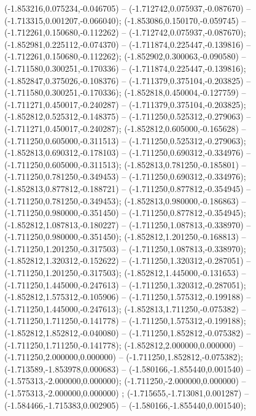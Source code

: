  (-1.853216,0.075234,-0.046705) -- (-1.712742,0.075937,-0.087670) -- (-1.713315,0.001207,-0.066040);
 (-1.853086,0.150170,-0.059745) -- (-1.712261,0.150680,-0.112262) -- (-1.712742,0.075937,-0.087670);
 (-1.852981,0.225112,-0.074370) -- (-1.711874,0.225447,-0.139816) -- (-1.712261,0.150680,-0.112262);
 (-1.852902,0.300063,-0.090580) -- (-1.711580,0.300251,-0.170336) -- (-1.711874,0.225447,-0.139816);
 (-1.852847,0.375026,-0.108376) -- (-1.711379,0.375104,-0.203825) -- (-1.711580,0.300251,-0.170336);
 (-1.852818,0.450004,-0.127759) -- (-1.711271,0.450017,-0.240287) -- (-1.711379,0.375104,-0.203825);
 (-1.852812,0.525312,-0.148375) -- (-1.711250,0.525312,-0.279063) -- (-1.711271,0.450017,-0.240287);
 (-1.852812,0.605000,-0.165628) -- (-1.711250,0.605000,-0.311513) -- (-1.711250,0.525312,-0.279063);
 (-1.852813,0.690312,-0.178103) -- (-1.711250,0.690312,-0.334976) -- (-1.711250,0.605000,-0.311513);
 (-1.852813,0.781250,-0.185801) -- (-1.711250,0.781250,-0.349453) -- (-1.711250,0.690312,-0.334976);
 (-1.852813,0.877812,-0.188721) -- (-1.711250,0.877812,-0.354945) -- (-1.711250,0.781250,-0.349453);
 (-1.852813,0.980000,-0.186863) -- (-1.711250,0.980000,-0.351450) -- (-1.711250,0.877812,-0.354945);
 (-1.852812,1.087813,-0.180227) -- (-1.711250,1.087813,-0.338970) -- (-1.711250,0.980000,-0.351450);
 (-1.852812,1.201250,-0.168813) -- (-1.711250,1.201250,-0.317503) -- (-1.711250,1.087813,-0.338970);
 (-1.852812,1.320312,-0.152622) -- (-1.711250,1.320312,-0.287051) -- (-1.711250,1.201250,-0.317503);
 (-1.852812,1.445000,-0.131653) -- (-1.711250,1.445000,-0.247613) -- (-1.711250,1.320312,-0.287051);
 (-1.852812,1.575312,-0.105906) -- (-1.711250,1.575312,-0.199188) -- (-1.711250,1.445000,-0.247613);
 (-1.852813,1.711250,-0.075382) -- (-1.711250,1.711250,-0.141778) -- (-1.711250,1.575312,-0.199188);
 (-1.852812,1.852812,-0.040080) -- (-1.711250,1.852812,-0.075382) -- (-1.711250,1.711250,-0.141778);
 (-1.852812,2.000000,0.000000) -- (-1.711250,2.000000,0.000000) -- (-1.711250,1.852812,-0.075382);
 (-1.713589,-1.853978,0.000683) -- (-1.580166,-1.855440,0.001540) -- (-1.575313,-2.000000,0.000000);
 (-1.711250,-2.000000,0.000000) -- (-1.575313,-2.000000,0.000000) ;
 (-1.715655,-1.713081,0.001287) -- (-1.584466,-1.715383,0.002905) -- (-1.580166,-1.855440,0.001540);
